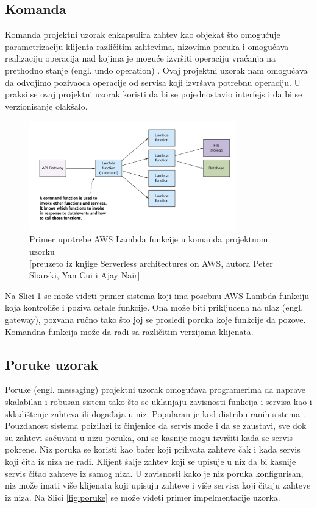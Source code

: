 \documentclass[12pt,oneside]{memoir}
\begin{document}
\subsection{Komanda}
Komanda projektni uzorak enkapsulira zahtev kao objekat što omogućuje parametrizaciju klijenta različitim zahtevima, nizovima poruka i omogućava realizaciju operacija nad kojima je moguće izvršiti operaciju vraćanja na prethodno stanje (engl. undo operation) \cite{cdp}. Ovaj projektni uzorak nam omogućava da odvojimo pozivaoca operacije od servisa koji izvršava potrebnu operaciju. U praksi se ovaj projektni uzorak koristi da bi se pojednostavio interfejs i da bi se verzionisanje olakšalo.

\begin{figure}[!ht]
  \centering
  \includegraphics[width=0.8\textwidth]{Slika 12.png}
  \caption{Primer upotrebe AWS Lambda funkcije u komanda projektnom uzorku\\\footnotesize[preuzeto iz knjige Serverless architectures on AWS, autora Peter Sbarski, Yan Cui i Ajay Nair]}
  \label{fig:komanda}
\end{figure}
 
Na Slici \ref{fig:komanda} se može videti primer sistema koji ima posebnu AWS Lambda funkciju koja kontroliše i poziva ostale funkcije. Ona može biti prikljucena na ulaz (engl. gateway), pozvana ručno tako što joj se prosledi poruka koje funkcije da pozove. Komandna funkcija može da radi sa različitim verzijama klijenata.

\subsection{Poruke uzorak} %

Poruke (engl. messaging) projektni uzorak omogućava programerima da naprave skalabilan i robusan sistem tako što se uklanjaju zavisnosti funkcija i servisa kao i skladištenje zahteva ili događaja u niz. Popularan je kod distribuiranih sistema \cite{sa}. Pouzdanost sistema poizilazi iz činjenice da servis može i da se zaustavi, sve dok su zahtevi sačuvani u nizu poruka, oni se kasnije mogu izvršiti kada se servis pokrene. Niz poruka se koristi kao bafer koji prihvata zahteve čak i kada servis koji čita iz niza ne radi. Klijent šalje zahtev koji se upisuje u niz da bi kasnije servis čitao zahteve iz samog niza. U zavisnosti kako je niz poruka konfigurisan, niz može imati više klijenata koji upisuju zahteve i više servisa koji čitaju zahteve iz niza. Na Slici \ref{fig:poruke} se može videti primer impelmentacije uzorka.
\end{document}
